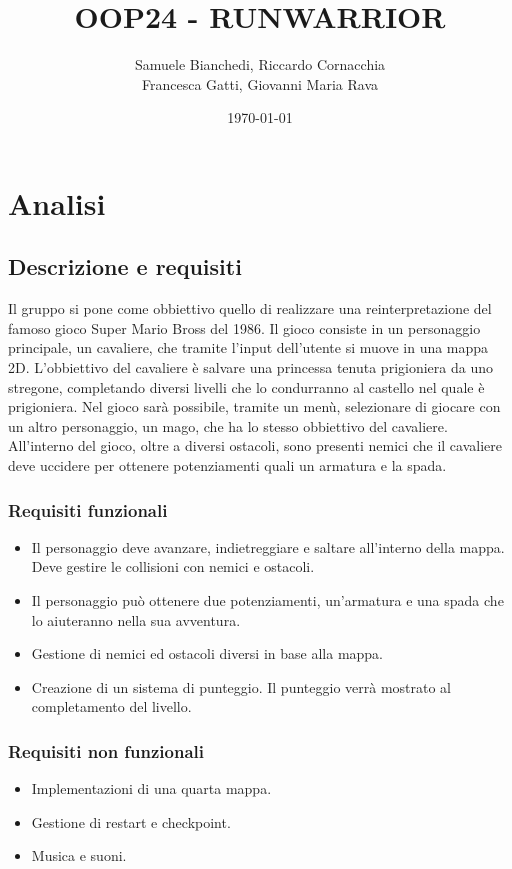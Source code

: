 \documentclass[a4paper,12pt]{report}
\title{OOP24 - RUNWARRIOR}
\author{
    Samuele Bianchedi, Riccardo Cornacchia\\
    Francesca Gatti, Giovanni Maria Rava}
\date{\today}
\begin{document}
\maketitle
\chapter{Analisi}
\section{Descrizione e requisiti}
Il gruppo si pone come obbiettivo quello di realizzare una reinterpretazione del famoso gioco 
Super Mario Bross del 1986. Il gioco consiste in un personaggio principale, un cavaliere, che tramite 
l'input dell'utente si muove in una mappa 2D. L'obbiettivo del cavaliere è salvare una princessa tenuta
prigioniera da uno stregone, completando diversi livelli che lo condurranno al castello nel quale è 
prigioniera. Nel gioco sarà possibile, tramite un menù, selezionare di giocare con un altro personaggio, 
un mago, che ha lo stesso obbiettivo del cavaliere. All'interno del gioco, oltre a diversi ostacoli, sono presenti nemici che il 
cavaliere deve uccidere per ottenere potenziamenti quali un armatura e la spada.
\subsection*{Requisiti funzionali}
\begin{itemize}
    \item Il personaggio deve avanzare, indietreggiare e saltare all'interno della mappa. Deve gestire le collisioni con nemici e ostacoli.
    \item Il personaggio può ottenere due potenziamenti, un'armatura e una spada che lo aiuteranno nella sua avventura.
    \item Gestione di nemici ed ostacoli diversi in base alla mappa.
    \item Creazione di un sistema di punteggio. Il punteggio verrà mostrato al completamento del livello.
\end{itemize}
\newpage
\subsection*{Requisiti non funzionali}
\begin{itemize}
    \item Implementazioni di una quarta mappa. 
    \item Gestione di restart e checkpoint.
    \item Musica e suoni. 
\end{itemize}
\end{document}
